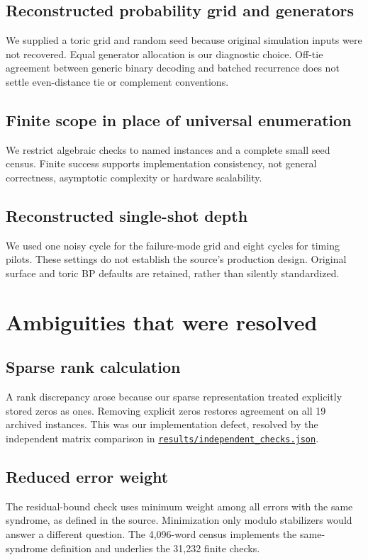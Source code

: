 \documentclass[11pt]{article}
\begin{document}
\subsection{Reconstructed probability grid and generators}
We supplied a toric grid and random seed because original simulation inputs were not recovered. Equal generator allocation is our diagnostic choice. Off-tie agreement between generic binary decoding and batched recurrence does not settle even-distance tie or complement conventions.
\subsection{Finite scope in place of universal enumeration}
We restrict algebraic checks to named instances and a complete small seed census. Finite success supports implementation consistency, not general correctness, asymptotic complexity or hardware scalability.
\subsection{Reconstructed single-shot depth}
We used one noisy cycle for the failure-mode grid and eight cycles for timing pilots. These settings do not establish the source's production design. Original surface and toric BP defaults are retained, rather than silently standardized.

\section{Ambiguities that were resolved}
\subsection{Sparse rank calculation}
A rank discrepancy arose because our sparse representation treated explicitly stored zeros as ones. Removing explicit zeros restores agreement on all 19 archived instances. This was our implementation defect, resolved by the independent matrix comparison in \href{https://github.com/alectionary/vibe-math/blob/master/formalization/quintavalle-hgp/results/independent_checks.json}{\nolinkurl{results/independent_checks.json}}.
\subsection{Reduced error weight}
The residual-bound check uses minimum weight among all errors with the same syndrome, as defined in the source. Minimization only modulo stabilizers would answer a different question. The 4,096-word census implements the same-syndrome definition and underlies the 31,232 finite checks.
\end{document}

